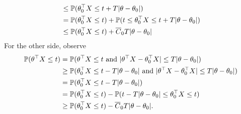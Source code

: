 {\begin{align}
\begin{split}
&  \le \mathbb{P}(\theta_0^\top X\le t +  T|{\theta}-\theta_0|)\\
& = \mathbb{P}(\theta_0^\top X\le t) + \mathbb{P}( t \le \theta_0^\top X\le  t+ T|{\theta}-\theta_0|)\\
& \le  \mathbb{P}(\theta_0^\top X\le t) + \overline{C}_0 T |{\theta}-\theta_0|
\end{split}
\end{align}
For the other side, observe
\begin{align}\label{eq:Equation Label}
\begin{split}
\mathbb{P}(\theta^\top X\le t ) &= \mathbb{P}(\theta^\top X\le t \text{ and } |\theta^\top X- \theta_0^\top X| \le  T|{\theta}-\theta_0|)\\
&\ge \mathbb{P} (\theta_0^\top X \le t-T|{\theta}-\theta_0|\text{ and } |\theta^\top X- \theta_0^\top X| \le  T|{\theta}-\theta_0|)\\
&= \mathbb{P} (\theta_0^\top X \le t-T|{\theta}-\theta_0|)\\
& = \mathbb{P}(\theta_0^\top X\le t) - \mathbb{P}( t-T|{\theta}-\theta_0| \le \theta_0^\top X\le  t)\\
& \ge  \mathbb{P}(\theta_0^\top X\le t) - \overline{C}_0 T |{\theta}-\theta_0|.
\end{split}
\end{align}


}
